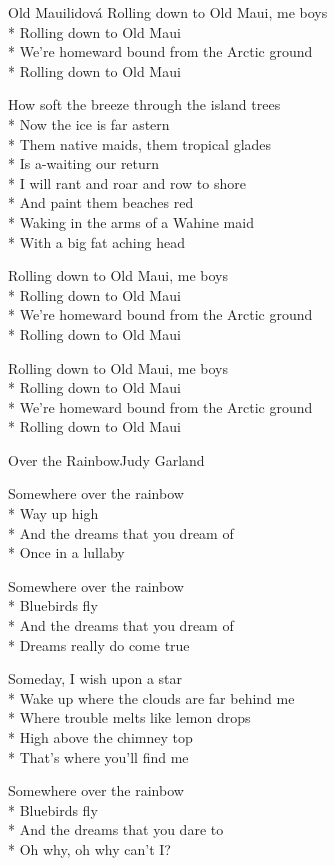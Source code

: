 \documentclass[10.5pt]{book}
\begin{document}
\begin{poem}{Old Maui}{lidová}
Rolling down to Old Maui, me boys\\*
Rolling down to Old Maui\\*
We're homeward bound from the Arctic ground\\*
Rolling down to Old Maui

How soft the breeze through the island trees\\*
Now the ice is far astern\\*
Them native maids, them tropical glades\\*
Is a-waiting our return\\*
I will rant and roar and row to shore\\*
And paint them beaches red\\*
Waking in the arms of a Wahine maid\\*
With a big fat aching head

Rolling down to Old Maui, me boys\\*
Rolling down to Old Maui\\*
We're homeward bound from the Arctic ground\\*
Rolling down to Old Maui

Rolling down to Old Maui, me boys\\*
Rolling down to Old Maui\\*
We're homeward bound from the Arctic ground\\*
Rolling down to Old Maui

\end{poem}

\begin{poem}{Over the Rainbow}{Judy Garland}

\settowidth{\versewidth}{Wake up where the clouds are far behind me}

Somewhere over the rainbow\\*
Way up high\\*
And the dreams that you dream of\\*
Once in a lullaby

Somewhere over the rainbow\\*
Bluebirds fly\\*
And the dreams that you dream of\\*
Dreams really do come true

Someday, I wish upon a star\\*
Wake up where the clouds are far behind me\\*
Where trouble melts like lemon drops\\*
High above the chimney top\\*
That's where you'll find me

Somewhere over the rainbow\\*
Bluebirds fly\\*
And the dreams that you dare to\\*
Oh why, oh why can't I?

\end{poem}
\end{document}
